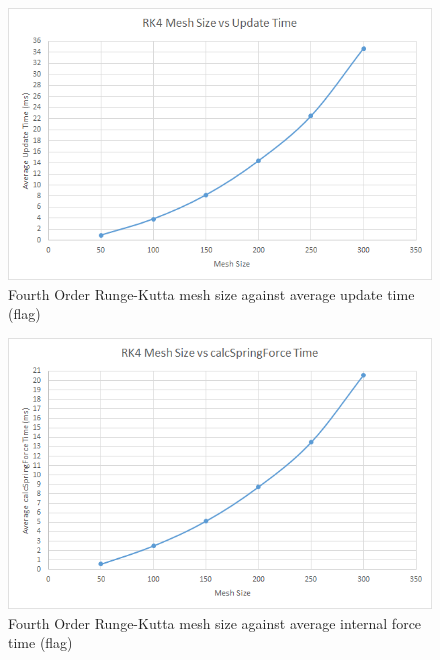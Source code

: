     \begin{figure}
    \begin{center}
      \includegraphics[scale=.9]{Figures/flag_rk4_m_ut}
    \end{center}
    \caption{Fourth Order Runge-Kutta mesh size against average update time (flag)}
    \label{fig:rk4 mesh update flag}
  \end{figure}
  
    \begin{figure}
    \begin{center}
      \includegraphics[scale=.9]{Figures/flag_rk4_m_csf}
    \end{center}
    \caption{Fourth Order Runge-Kutta mesh size against average internal force time (flag)}
    \label{fig:rk4 mesh csf flag}
  \end{figure}
  
